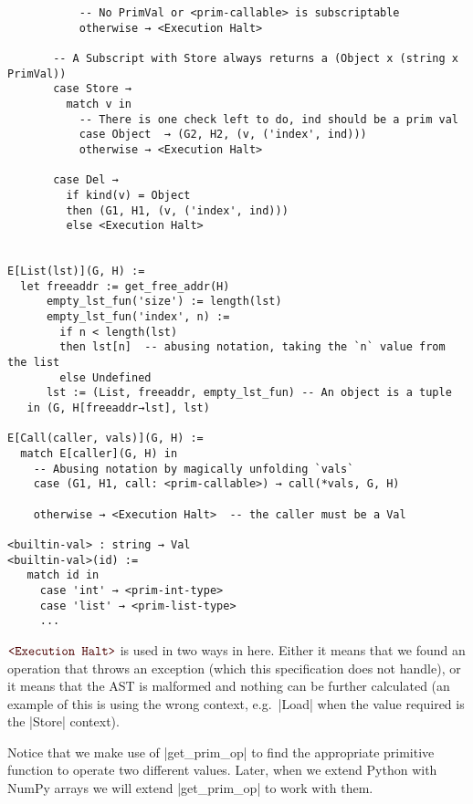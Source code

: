 \begin{verbatim}
           -- No PrimVal or <prim-callable> is subscriptable
           otherwise → <Execution Halt>

       -- A Subscript with Store always returns a (Object x (string x PrimVal))
       case Store →
         match v in
           -- There is one check left to do, ind should be a prim val
           case Object  → (G2, H2, (v, ('index', ind)))
           otherwise → <Execution Halt>

       case Del →
         if kind(v) = Object
         then (G1, H1, (v, ('index', ind)))
         else <Execution Halt>


E[List(lst)](G, H) :=
  let freeaddr := get_free_addr(H)
      empty_lst_fun('size') := length(lst)
      empty_lst_fun('index', n) :=
        if n < length(lst)
        then lst[n]  -- abusing notation, taking the `n` value from the list
        else Undefined
      lst := (List, freeaddr, empty_lst_fun) -- An object is a tuple
   in (G, H[freeaddr→lst], lst)

E[Call(caller, vals)](G, H) :=
  match E[caller](G, H) in
    -- Abusing notation by magically unfolding `vals`
    case (G1, H1, call: <prim-callable>) → call(*vals, G, H)

    otherwise → <Execution Halt>  -- the caller must be a Val

<builtin-val> : string → Val
<builtin-val>(id) :=
   match id in
     case 'int' → <prim-int-type>
     case 'list' → <prim-list-type>
     ...
\end{verbatim}

$\Halt$ is used in two ways in
here. Either it means that we found an operation that throws an
exception (which this specification does not handle), or it means that
the AST is malformed and nothing can be further calculated (an example
of this is using the wrong context, e.g.~\pycode|Load| when the value
required is the \pycode|Store| context).


Notice that we make use of \pycode|get_prim_op| to find the appropriate
primitive function to operate two different values. Later, when we
extend Python with NumPy arrays we will extend \pycode|get_prim_op| to
work with them.

